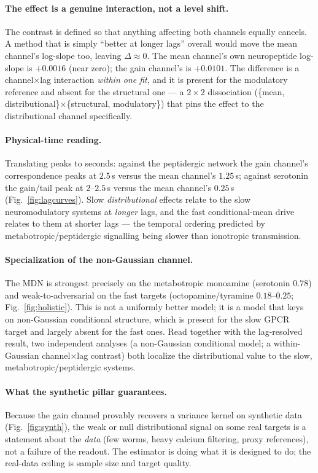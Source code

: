 \documentclass[11pt]{article}
\begin{document}
\paragraph{The effect is a genuine interaction, not a level shift.} The contrast is defined so that
anything affecting both channels equally cancels. A method that is simply ``better at longer lags''
overall would move the mean channel's log-slope too, leaving $\Delta\approx0$. The mean channel's
own neuropeptide log-slope is $+0.0016$ (near zero); the gain channel's is $+0.0101$. The difference
is a channel$\times$lag interaction \emph{within one fit}, and it is present for the modulatory
reference and absent for the structural one --- a $2\times2$ dissociation
(\{mean, distributional\}$\times$\{structural, modulatory\}) that pins the effect to the
distributional channel specifically.

\paragraph{Physical-time reading.} Translating peaks to seconds: against the peptidergic network the
gain channel's correspondence peaks at $2.5$\,s versus the mean channel's $1.25$\,s; against
serotonin the gain/tail peak at $2$--$2.5$\,s versus the mean channel's $0.25$\,s
(Fig.~\ref{fig:lagcurves}). Slow \emph{distributional} effects relate to the slow neuromodulatory
systems at \emph{longer} lags, and the fast conditional-mean drive relates to them at shorter lags
--- the temporal ordering predicted by metabotropic/peptidergic signalling being slower than
ionotropic transmission.

\paragraph{Specialization of the non-Gaussian channel.} The MDN is strongest precisely on the
metabotropic monoamine (serotonin $0.78$) and weak-to-adversarial on the fast targets
(octopamine/tyramine $0.18$--$0.25$; Fig.~\ref{fig:holistic}). This is not a uniformly better model;
it is a model that keys on non-Gaussian conditional structure, which is present for the slow GPCR
target and largely absent for the fast ones. Read together with the lag-resolved result, two
independent analyses (a non-Gaussian conditional model; a within-Gaussian channel$\times$lag
contrast) both localize the distributional value to the slow, metabotropic/peptidergic systems.

\paragraph{What the synthetic pillar guarantees.} Because the gain channel provably recovers a
variance kernel on synthetic data (Fig.~\ref{fig:synth}), the weak or null distributional signal on
some real targets is a statement about the \emph{data} (few worms, heavy calcium filtering, proxy
references), not a failure of the readout. The estimator is doing what it is designed to do; the
real-data ceiling is sample size and target quality.
\end{document}
